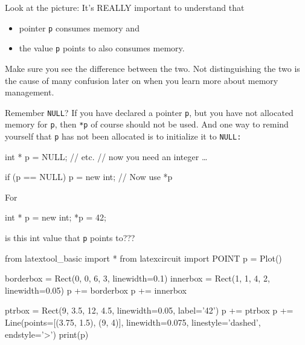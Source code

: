 Look at the picture: It's REALLY important to understand that

\begin{itemize}

\item
  pointer \texttt{p} consumes memory and
\item
  the value \texttt{p} points to also consumes memory.
\end{itemize}

Make sure you see the difference between the two. Not distinguishing the two is the cause of many confusion later on when you learn more about memory management.


Remember \texttt{NULL}? If you have declared a pointer \texttt{p}, but you have not allocated memory for \texttt{p}, then \texttt{*p} of course should not be used. And one way to remind yourself that \texttt{p} has not been allocated is to initialize it to \texttt{NULL:}

\begin{consolethree}[escapeinside=||]
int * p = NULL;
                // etc.
                // now you need an integer \ldots

if (p == NULL)
{
    p = new int;
}
// Now use *p
\end{consolethree}



For

\begin{consolethree}[escapeinside=||]
int * p = new int;
*p = 42;
\end{consolethree}
\textit{} is this int value that \texttt{p} points to???
\begin{python}
from latextool_basic import *
from latexcircuit import POINT
p = Plot()

borderbox = Rect(0, 0, 6, 3, linewidth=0.1)
innerbox = Rect(1, 1, 4, 2, linewidth=0.05)
p += borderbox
p += innerbox

ptrbox = Rect(9, 3.5, 12, 4.5, linewidth=0.05, label='42')
p += ptrbox
p += Line(points=[(3.75, 1.5), (9, 4)], linewidth=0.075, linestyle='dashed', endstyle='>')
print(p)
\end{python}


